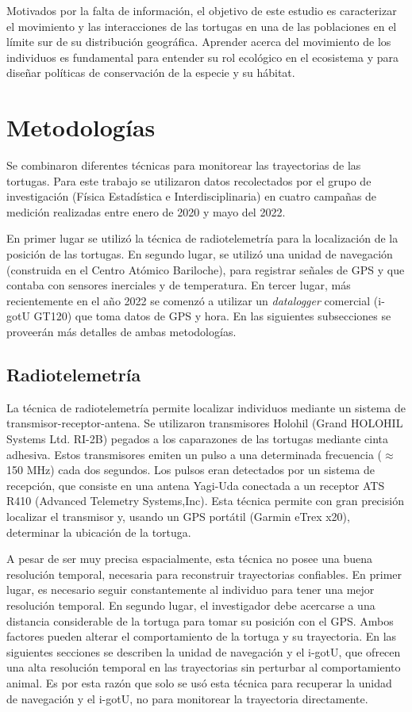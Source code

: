 Motivados por la falta de información, el objetivo de este estudio es caracterizar el movimiento y las interacciones de las tortugas en una de las poblaciones en el límite sur de su distribución geográfica. Aprender acerca del movimiento de los individuos es fundamental para entender su rol ecológico en el ecosistema y para diseñar políticas de conservación de la especie y su hábitat.
 
 
\section{Metodologías}
 
Se combinaron diferentes técnicas para monitorear las trayectorias de las tortugas. Para este trabajo se utilizaron datos recolectados por  el grupo de investigación (Física Estadística e Interdisciplinaria) en cuatro campañas de medición realizadas entre enero de 2020 y mayo del 2022.
 
En primer lugar se utilizó la técnica de radiotelemetría para la localización de la posición de las tortugas. En segundo lugar, se utilizó una unidad de navegación (construida en el Centro Atómico Bariloche), para registrar señales de GPS y que contaba con sensores inerciales y de temperatura. En tercer lugar, más recientemente en el año 2022 se comenzó a utilizar un \textit{datalogger} comercial (i-gotU GT120) que toma datos de GPS y hora. En las siguientes subsecciones se proveerán más detalles de ambas metodologías.
 
\subsection{Radiotelemetría}
La técnica de radiotelemetría permite localizar individuos mediante un sistema de transmisor-receptor-antena. Se utilizaron transmisores Holohil (Grand HOLOHIL Systems Ltd. RI-2B) pegados a los caparazones de las tortugas mediante cinta adhesiva. Estos transmisores emiten un pulso a una determinada frecuencia ($\approx$150 MHz) cada dos segundos. Los pulsos eran detectados por un sistema de recepción, que consiste en una antena Yagi-Uda conectada a un receptor ATS R410 (Advanced Telemetry Systems,Inc). Esta técnica permite con gran precisión localizar el transmisor y, usando un GPS portátil (Garmin eTrex
x20), determinar la ubicación de la tortuga.
 
A pesar de ser muy precisa espacialmente, esta técnica no posee una buena resolución temporal, necesaria para reconstruir trayectorias confiables. En primer lugar, es necesario seguir constantemente al individuo para tener una mejor resolución temporal. En segundo lugar, el investigador debe acercarse a una distancia considerable de la tortuga para tomar su posición con el GPS. Ambos factores pueden alterar el comportamiento de la tortuga y su trayectoria. En las siguientes secciones se describen la unidad de navegación y el i-gotU, que ofrecen una alta resolución temporal en las trayectorias sin perturbar al comportamiento animal. Es por esta razón que solo se usó esta técnica para recuperar la unidad de navegación y el i-gotU, no para monitorear la trayectoria directamente.
 
